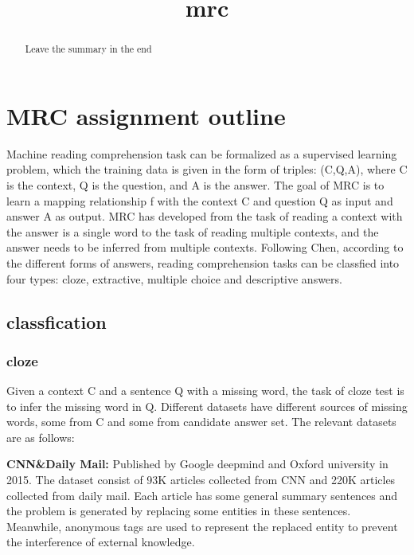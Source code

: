 \documentclass{article}
\title{mrc}
\date{}
\begin{document}
    \maketitle %
	\begin{abstract}
		Leave the summary in the end
	\end{abstract}



\section{MRC assignment outline}
Machine reading comprehension task can be formalized as a supervised learning problem, which the training data 
is given in the form of triples: (C,Q,A), where C is the context, Q is the question, and A is the answer. 
The goal of MRC is to learn a mapping relationship f with the context C and question Q as input and answer A as output. 
MRC has developed from the task of reading a context with the answer is a single word to the task of reading 
multiple contexts, and the answer needs to be inferred from multiple contexts. 
Following Chen, according to the different forms of answers, reading comprehension tasks can be classfied into four types: 
cloze, extractive, multiple choice and descriptive answers.
\subsection{classfication}

\subsubsection{cloze}
Given a context C and a sentence Q with a missing word, the task of cloze test is to infer the missing word in Q. 
Different datasets have different sources of missing words, some from C and some from candidate answer set. 
The relevant datasets are as follows:

\noindent\textbf{CNN\&Daily Mail: }Published by Google deepmind and Oxford university in 2015. The dataset consist of 
93K articles collected from CNN and 220K articles collected from daily mail. Each article has some general summary sentences and the problem is generated 
by replacing some entities in these sentences. Meanwhile, anonymous tags are used to represent the replaced entity to 
prevent the interference of external knowledge.
\end{document}
